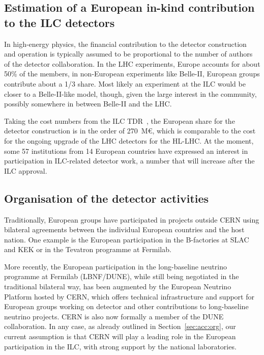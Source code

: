 \documentclass[%
 reprint,
 floatfix,
 amsmath,amssymb,
 aps,
]{revtex4-1}
\begin{document}
\subsection{\label{sec:det:constructionmodel} Estimation of a
European in-kind contribution to the ILC detectors}

In high-energy physics, the financial contribution to the detector
construction and operation is typically assumed to be proportional to the number of authors of
the detector collaboration. In the LHC experiments, Europe accounts for about 50\% of the members, 
in non-European experiments like Belle-II, European groups contribute about a 1/3 share. Most likely 
an experiment at the ILC would be closer to a Belle-II-like model, though, given the large interest 
in the community, possibly somewhere in between Belle-II and the LHC. 

Taking the cost numbers from the ILC TDR~\cite{Behnke:2013lya}, the European share for the detector construction 
is in the order of 270~M\euro{}, which is comparable to the cost for the ongoing upgrade of the LHC detectors for the HL-LHC. 
At the moment, some 57 institutions from 14 European countries have expressed 
an interest in participation in ILC-related detector work, a number that will increase after the ILC approval.

\subsection{\label{sec:det:Organisation} Organisation of the detector activities}
Traditionally, European groups have participated in projects outside CERN using bilateral 
agreements between the individual European countries and the host nation. One example is the European 
participation in the B-factories at SLAC and KEK or in the Tevatron programme at 
Fermilab.

More recently, the European participation in the long-baseline neutrino 
programme at Fermilab (LBNF/DUNE), while still being negotiated in the 
traditional bilateral way, has been augmented by the European Neutrino Platform 
hosted by CERN, which offers technical infrastructure and support for European 
groups working on detector and other contributions to long-baseline neutrino 
projects. CERN is also now formally a member of the DUNE collaboration.
In any case, as already outlined in Section~\ref{sec:acc:org}, our current assumption is that 
CERN will play a leading role in the European participation in the ILC, 
with strong support by the national laboratories.
\end{document}
